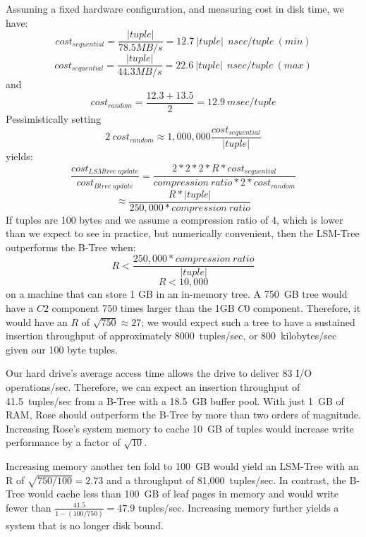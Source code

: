 \documentclass{vldb}
\newcommand{\rows}{Rose\xspace}
\newcommand{\rowss}{Rose's\xspace}
\begin{document}
Assuming a fixed hardware configuration, and measuring cost in disk
time, we have:
\[
   cost_{sequential}=\frac{|tuple|}{78.5MB/s}=12.7~|tuple|~~nsec/tuple~(min)
\]
\[
   cost_{sequential}=\frac{|tuple|}{44.3MB/s}=22.6~|tuple|~~nsec/tuple~(max)
\]
and
\[
   cost_{random}=\frac{12.3+13.5}{2} = 12.9~msec/tuple
\]
Pessimistically setting
\[
2~cost_{random}\approx1,000,000\frac{cost_{sequential}}{|tuple|}
\] yields: \[
    \frac{cost_{LSMtree~update}}{cost_{Btree~update}}=\frac{2*2*2*R*cost_{sequential}}{compression~ratio*2*cost_{random}}
\]
\[
   \approx\frac{R*|tuple|}{250,000*compression~ratio}
\]
If tuples are 100 bytes and we assume a compression ratio of 4, which is lower
than we expect to see in practice, but numerically convenient, then the
LSM-Tree outperforms the B-Tree when:
\[
    R < \frac{250,000*compression~ratio}{|tuple|}
\]
\[
    R < 10,000
\]
on a machine that can store 1 GB in an in-memory tree.
  A 750~GB tree would
have a $C2$ component 750 times larger than the 1GB $C0$ component.
Therefore, it would have an $R$ of $\sqrt{750}\approx27$; we would
expect such a tree to have a sustained insertion throughput of
approximately 8000~tuples/sec, or 800~kilobytes/sec
given our 100 byte tuples.

Our hard drive's average access time allows the drive to deliver 83 I/O operations/sec.
Therefore, we can expect an insertion throughput of 41.5~tuples/sec from a B-Tree with
a 18.5~GB buffer pool.  With just 1~GB of RAM, \rows should outperform the
B-Tree by more than two orders of magnitude.  Increasing \rowss system
memory to cache 10~GB of tuples would increase write performance by a
factor of $\sqrt{10}$.


Increasing memory another ten fold to 100~GB would yield an LSM-Tree
with an R of $\sqrt{750/100} = 2.73$ and a throughput of 81,000~tuples/sec.
In contrast, the B-Tree would cache less than 100~GB of leaf pages
in memory and would write fewer than $\frac{41.5}{1-(100/750)} = 47.9$
tuples/sec.  Increasing memory further yields a system that
is no longer disk bound.
\end{document}
